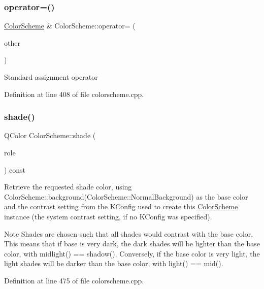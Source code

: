 \subsubsection{\texorpdfstring{operator=()}{operator=()}}
{\footnotesize\ttfamily \hyperlink{class_color_scheme}{Color\+Scheme} \& Color\+Scheme\+::operator= (\begin{DoxyParamCaption}\item[{const \hyperlink{class_color_scheme}{Color\+Scheme} \&}]{other }\end{DoxyParamCaption})}

Standard assignment operator 

Definition at line 408 of file colorscheme.\+cpp.

\mbox{\label{class_color_scheme_aade3447ab7cc9e291474e1e1ea46b4cd}} 
\subsubsection{\texorpdfstring{shade()}{shade()}\hspace{0.1cm}{\footnotesize\ttfamily [1/3]}}
{\footnotesize\ttfamily Q\+Color Color\+Scheme\+::shade (\begin{DoxyParamCaption}\item[{\hyperlink{class_color_scheme_a666c52f132343e360756a126d558cdd6}{Shade\+Role}}]{role }\end{DoxyParamCaption}) const}

Retrieve the requested shade color, using Color\+Scheme\+::background(\+Color\+Scheme\+::\+Normal\+Background) as the base color and the contrast setting from the K\+Config used to create this \hyperlink{class_color_scheme}{Color\+Scheme} instance (the system contrast setting, if no K\+Config was specified).

\begin{DoxyNote}{Note}
Shades are chosen such that all shades would contrast with the base color. This means that if base is very dark, the \textquotesingle{}dark\textquotesingle{} shades will be lighter than the base color, with midlight() == shadow(). Conversely, if the base color is very light, the \textquotesingle{}light\textquotesingle{} shades will be darker than the base color, with light() == mid(). 
\end{DoxyNote}


Definition at line 475 of file colorscheme.\+cpp.

